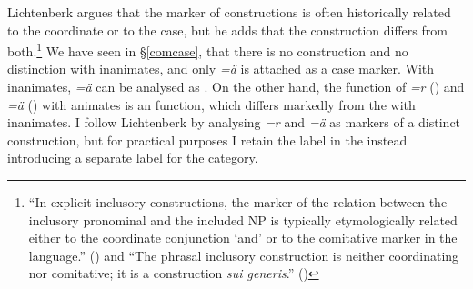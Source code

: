 Lichtenberk argues that the marker of  constructions is often historically related to the coordinate  or to the  case, but he adds that the  construction differs from both.\footnote{``In explicit inclusory constructions, the marker of the relation between the inclusory pronominal and the included NP is typically etymologically related either to the coordinate conjunction `and' or to the comitative marker in the language.'' (\citealt[4]{Lichtenberk:2000hr}) and ``The phrasal inclusory construction is neither coordinating nor comitative; it is a construction \emph{sui generis}.'' (\citeyear[30, emphasis in original]{Lichtenberk:2000hr})} We have seen in \S\ref{comcase}, that there is no  construction and no  distinction with inanimates, and only \emph{=ä} is attached as a case marker. With inanimates, \emph{=ä} can be analysed as  . On the other hand, the function of \emph{=r} (\Du) and \emph{=ä} (\Pl) with animates is an  function, which differs markedly from the  with inanimates. I follow Lichtenberk by analysing \emph{=r} and \emph{=ä} as markers of a distinct  construction, but for practical purposes I retain the label \Assoc{} in the  instead introducing a separate label for the  category.